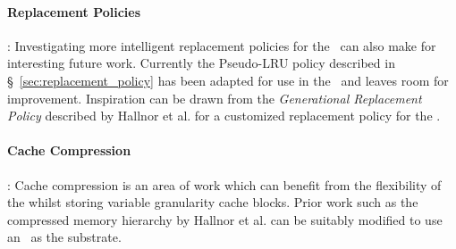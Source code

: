 \paragraph{Replacement Policies}: Investigating more intelligent replacement policies for the \AC\ can also make for interesting future work. Currently the Pseudo-LRU policy described in \S~\ref{sec:replacement_policy} has been adapted for use in the \AC\ and leaves room for improvement. Inspiration can be drawn from the \textit{Generational Replacement Policy} described by Hallnor et al.\cite{Hallnor_Reinhardt_2000} for a customized replacement policy for the \AC{}. 

\paragraph{Cache Compression}: Cache compression is an area of work which can benefit from the flexibility of the \AC{} whilst storing variable granularity cache blocks. Prior work such as the compressed memory hierarchy by Hallnor et al.\cite{Hallnor04acompressed} can be suitably modified to use an \AC\ as the substrate.


